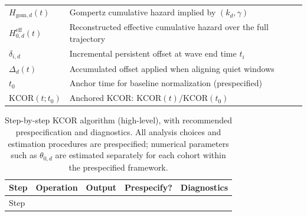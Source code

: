 \documentclass[
]{article}
\begin{document}
\begin{longtable}[]{@{}
  >{\raggedright\arraybackslash}p{}
  >{\raggedright\arraybackslash}p{}@{}}
\(H_{\mathrm{gom},d}(t)\) & Gompertz cumulative hazard implied by \((k_d,\gamma)\) \\
\(H_{0,d}^{\mathrm{eff}}(t)\) & Reconstructed effective cumulative hazard over the full trajectory \\
\(\delta_{i,d}\) & Incremental persistent offset at wave end time \(t_i\) \\
\(\Delta_d(t)\) & Accumulated offset applied when aligning quiet windows \\
\(t_0\) & Anchor time for baseline normalization (prespecified) \\
\(\mathrm{KCOR}(t; t_0)\) & Anchored KCOR: \(\mathrm{KCOR}(t)/\mathrm{KCOR}(t_0)\) \\
\end{longtable}

\begin{longtable}[]{@{}
  >{\raggedright\arraybackslash}p{}
  >{\raggedright\arraybackslash}p{}
  >{\raggedright\arraybackslash}p{}
  >{\raggedright\arraybackslash}p{}
  >{\raggedright\arraybackslash}p{}@{}}
\caption{Step-by-step KCOR algorithm (high-level), with recommended prespecification and diagnostics. All analysis choices and estimation procedures are prespecified; numerical parameters such as \(\theta_{0,d}\) are estimated separately for each cohort within the prespecified framework.}\label{tbl:KCOR_algorithm}\tabularnewline
\toprule\noalign{}
\begin{minipage}[b]{\linewidth}\raggedright
Step
\end{minipage} & \begin{minipage}[b]{\linewidth}\raggedright
Operation
\end{minipage} & \begin{minipage}[b]{\linewidth}\raggedright
Output
\end{minipage} & \begin{minipage}[b]{\linewidth}\raggedright
Prespecify?
\end{minipage} & \begin{minipage}[b]{\linewidth}\raggedright
Diagnostics
\end{minipage} \\
\midrule\noalign{}
\endfirsthead
\toprule\noalign{}
\begin{minipage}[b]{\linewidth}\raggedright
Step
\end{minipage} & \begin{minipage}[b]{\linewidth}\raggedright

\end{minipage}
\end{longtable}
\end{document}
